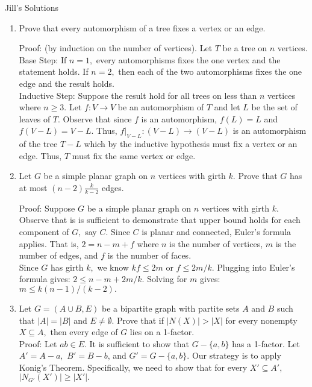 \documentclass[12pt]{article}
\begin{document}
Jill's Solutions

\begin{enumerate}

\item Prove that every automorphism of a tree fixes a vertex or an edge.

Proof: (by induction on the number of vertices).  Let $T$ be a tree on $n$ vertices. \\
Base Step: If $n=1,$ every automorphisms fixes the one vertex and the statement holds. If $n=2,$ then each of the two automorphisms fixes the one edge and the result holds. \\
Inductive Step: Suppose the result hold for all trees on less than $n$ vertices where $n\geq 3.$ Let $f: V \to V$ be an automorphism of $T$ and let $L$ be the set of leaves of $T.$ Observe that since $f$ is an automorphism, $f(L)=L$ and $f(V-L)=V-L.$ Thus, $f \vert_{V-L}: (V-L) \to (V-L)$ is an automorphism of the tree $T-L$ which by the inductive hypothesis must fix a vertex or an edge. Thus, $T$ must fix the same vertex or edge. 

\item Let $G$ be a simple planar graph on $n$ vertices with girth $k.$ Prove that $G$ has at most $(n-2)\frac{k}{k-2}$ edges.

Proof: Suppose $G$ be a simple planar graph on $n$ vertices with girth $k.$ Observe that is is sufficient to demonstrate that upper bound holds for each component of $G,$ say $C.$ Since $C$ is planar and connected, Euler's formula applies. That is, $2=n-m+f$ where $n$ is the number of vertices, $m$ is the number of edges, and $f$ is the number of faces. \\
Since $G$ has girth $k,$ we know $kf \leq 2m$ or $f\leq 2m/k.$ Plugging into Euler's formula gives: $2 \leq n-m+2m/k.$ Solving for $m$ gives: $m\leq k(n-1)/(k-2).$\\

\item Let $G=(A \cup B, E)$ be a bipartite graph with partite sets $A$ and $B$ such that $|A|=|B|$ and $E\not= \emptyset.$ Prove that if $|N(X)| > |X|$ for every nonempty $X \subseteq A,$ then every edge of $G$ lies on a 1-factor.\\

Proof: Let $ab \in E.$ It is sufficient to show that $G-\{a,b\}$ has a 1-factor. Let $A'=A-a,$ $B'=B-b$, and $G'=G-\{a,b\}.$ Our strategy is to apply Konig's Theorem. Specifically, we need to show that for every $X' \subseteq A',$ $|N_{G'}(X')| \geq |X'|.$\\


\end{enumerate}
\end{document}
